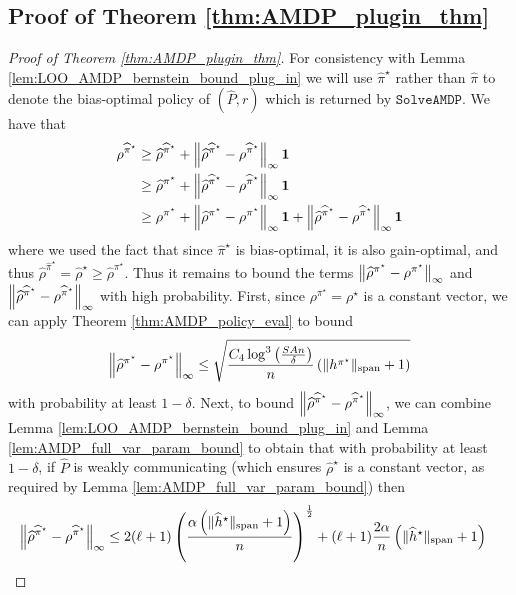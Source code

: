 \documentclass{article}
\theoremstyle{plain}
\theoremstyle{plain}
\theoremstyle{remark}
\theoremstyle{plain}
\theoremstyle{plain}
\newcommand{\Phat}{\widehat{P}}
\newcommand{\pistar}{\pi^\star}
\newcommand{\pihstar}{\widehat{\pi}^\star}
\newcommand{\one}{\mathbf{1}}
\newcommand{\pihat}{\widehat{\pi}}
\newcommand{\rhohat}{\widehat{\rho}}
\newcommand{\hhat}{\widehat{h}}
\newcommand{\SolveAMDP}{\texttt{SolveAMDP}}
\begin{document}
\subsection{Proof of Theorem \ref{thm:AMDP_plugin_thm}}
\label{sec:AMDP_plugin_pf}
\begin{proof}[Proof of Theorem \ref{thm:AMDP_plugin_thm}]
    For consistency with Lemma \ref{lem:LOO_AMDP_bernstein_bound_plug_in} we will use $\pihstar$ rather than $\pihat$ to denote the bias-optimal policy of $(\Phat, r)$ which is returned by $\SolveAMDP$. We have that
    \begin{align}
        \rho^{\pihstar} & \geq \rhohat^{\pihstar} + \infnorm{\rhohat^{\pihstar} - \rho^{\pihstar}} \one \nonumber\\
        & \geq \rhohat^{\pistar} + \infnorm{\rhohat^{\pihstar} - \rho^{\pihstar}} \one \nonumber \\
        & \geq \rho^{\pistar}+ \infnorm{\rhohat^{\pistar} - \rho^{\pistar} }\one + \infnorm{\rhohat^{\pihstar} - \rho^{\pihstar}} \one \label{eq:MDP_plugin_thm_pf_1}
    \end{align}
    where we used the fact that since $\pihstar$ is bias-optimal, it is also gain-optimal, and thus $\rhohat^{\pihstar} = \rhohat^{\star} \geq \rhohat^{\pistar}$. Thus it remains to bound the terms $\infnorm{\rhohat^{\pistar} - \rho^{\pistar} }$ and $\infnorm{\rhohat^{\pihstar} - \rho^{\pihstar}}$ with high probability. First, since $\rho^{\pistar} = \rho^\star$ is a constant vector, we can apply Theorem \ref{thm:AMDP_policy_eval} to bound
    \begin{align}
        \infnorm{\rhohat^{\pistar} - \rho^{\pistar} } \leq \sqrt{\frac{C_4 \log^3 \left( \frac{SAn}{\delta} \right)}{n} \left( \spannorm{h^{\pistar}}+1 \right)} \label{eq:MDP_plugin_thm_pf_2}
    \end{align}
    with probability at least $1 - \delta$. Next, to bound $\infnorm{\rhohat^{\pihstar} - \rho^{\pihstar}}$, we can combine Lemma \ref{lem:LOO_AMDP_bernstein_bound_plug_in} and Lemma \ref{lem:AMDP_full_var_param_bound} to obtain that with probability at least $1 - \delta$, if $\Phat$ is weakly communicating (which ensures $\rhohat^\star$ is a constant vector, as required by Lemma \ref{lem:AMDP_full_var_param_bound}) then
    \begin{align*}
        \infnorm{\rhohat^{\pihstar} - \rho^{\pihstar}} & \leq 2 (\ell + 1) \left(\frac{\alpha \left(\spannorm{\hhat^\star} + 1\right)}{n} \right)^{ \frac{1}{2}}+ (\ell+1) \frac{2\alpha   }{n}\left(\spannorm{\hhat^\star} + 1 \right) 

\end{align*}
\end{proof}
\end{document}
